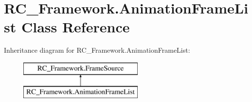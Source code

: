 \hypertarget{class_r_c___framework_1_1_animation_frame_list}{}\section{R\+C\+\_\+\+Framework.\+Animation\+Frame\+List Class Reference}
\label{class_r_c___framework_1_1_animation_frame_list}
Inheritance diagram for R\+C\+\_\+\+Framework.\+Animation\+Frame\+List\+:\begin{figure}[H]
\begin{center}
\leavevmode
\includegraphics[height=2.000000cm]{class_r_c___framework_1_1_animation_frame_list}
\end{center}
\end{figure}
